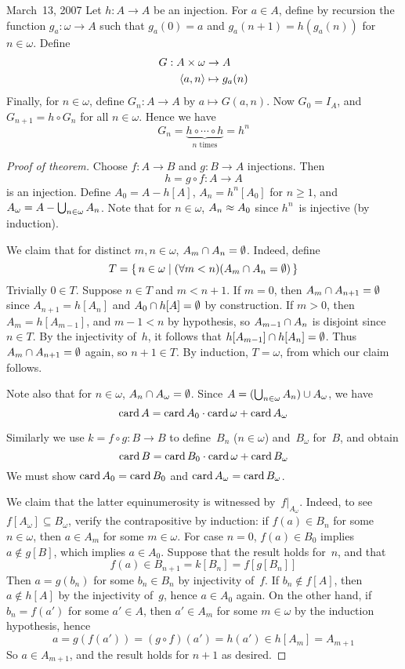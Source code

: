 \begin{lecture}{March~13, 2007}
Let \(h:A\to A\) be an injection. For \(a\in A\), define by recursion the function \(g_a:\omega\to A\) such that \(g_a(0)=a\) and \(g_a(n+1)=h(g_a(n))\) for \(n\in\omega\). Define
\begin{align*}
G:A\times\omega&\to A\\
	\langle{a},{n}\rangle&\mapsto g_a(n)
\end{align*}
Finally, for \(n\in\omega\), define \(G_n:A\to A\) by \(a\mapsto G(a,n)\). Now \(G_0=I_A\), and \(G_{n+1}=h\circ G_n\) for all \(n\in\omega\). Hence we have
\[G_n=\underbrace{h\circ\cdots\circ h}_{n\text{ times}}=h^n\]
\begin{proof}[Proof of theorem]
Choose \(f:A\to B\) and \(g:B\to A\) injections. Then
\[h=g\circ f:A\to A\]
is an injection. Define \(A_0=A-h[A]\), \(A_n=h^n[A_0]\) for \(n\ge 1\), and \(A_{\omega}=A-\bigcup_{n\in\omega}A_n\). Note that for \(n\in\omega\), \(A_n\approx A_0\) since \(h^n\)~is injective (by induction).

We claim that for distinct \(m,n\in\omega\), \(A_m\cap A_n=\emptyset\). Indeed, define
\[T=\{\,n\in\omega\mid(\forall m<n)(A_m\cap A_n=\emptyset)\,\}\]
Trivially \(0\in T\). Suppose \(n\in T\) and \(m<n+1\). If \(m=0\), then \(A_m\cap A_{n+1}=\emptyset\) since \(A_{n+1}=h[A_n]\) and \(A_0\cap h[A]=\emptyset\) by construction. If \(m>0\), then \(A_m=h[A_{m-1}]\), and \(m-1<n\) by hypothesis, so \(A_{m-1}\cap A_n\) is disjoint since \(n\in T\). By the injectivity of~\(h\), it follows that \(h[A_{m-1}]\cap h[A_n]=\emptyset\). Thus \(A_m\cap A_{n+1}=\emptyset\) again, so \(n+1\in T\). By induction, \(T=\omega\), from which our claim follows.

Note also that for \(n\in\omega\), \(A_n\cap A_{\omega}=\emptyset\). Since \(A=(\bigcup_{n\in\omega} A_n)\cup A_{\omega}\), we have
\[\operatorname{card} A=\operatorname{card} A_0\cdot\operatorname{card}\omega+\operatorname{card} A_{\omega}\]

Similarly we use \(k=f\circ g:B\to B\) to define~\(B_n\) (\(n\in\omega\)) and~\(B_{\omega}\) for~\(B\), and obtain
\[\operatorname{card} B=\operatorname{card} B_0\cdot\operatorname{card}\omega+\operatorname{card} B_{\omega}\]
We must show \(\operatorname{card} A_0=\operatorname{card} B_0\) and \(\operatorname{card} A_{\omega}=\operatorname{card} B_{\omega}\).

We claim that the latter equinumerosity is witnessed by~\(f|_{A_{\omega}}\). Indeed, to see \(f[A_{\omega}]\subseteq B_{\omega}\), verify the contrapositive by induction: if \(f(a)\in B_n\) for some \(n\in\omega\), then \(a\in A_m\) for some \(m\in\omega\). For case \(n=0\), \(f(a)\in B_0\) implies \(a\not\in g[B]\), which implies \(a\in A_0\). Suppose that the result holds for~\(n\), and that
\[f(a)\in B_{n+1}=k[B_n]=f[g[B_n]]\]
Then \(a=g(b_n)\) for some \(b_n\in B_n\) by injectivity of~\(f\). If \(b_n\not\in f[A]\), then \(a\not\in h[A]\) by the injectivity of~\(g\), hence \(a\in A_0\) again. On the other hand, if \(b_n=f(a')\) for some \(a'\in A\), then \(a'\in A_m\) for some \(m\in\omega\) by the induction hypothesis, hence
\[a=g(f(a'))=(g\circ f)(a')=h(a')\in h[A_m]=A_{m+1}\]
So \(a\in A_{m+1}\), and the result holds for \(n+1\) as desired.


\end{proof}
\end{lecture}
